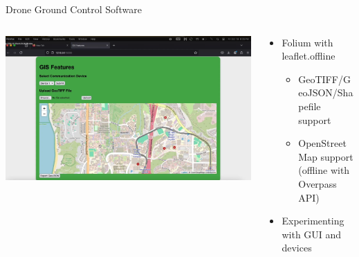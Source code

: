 \begin{frame}{Drone Ground Control Software}
    \begin{columns}
        \begin{column}{0.5\textwidth}
            \centering
            \includegraphics[height=0.7\textheight,width=\textwidth,keepaspectratio]{images/rtt/image.png}
        \end{column}
        \begin{column}{0.5\textwidth}
            \begin{itemize}
                \item Folium with leaflet.offline
                \begin{itemize}
                    \item GeoTIFF/GeoJSON/Shapefile support
                    \item OpenStreetMap support (offline with Overpass API)
                \end{itemize}
                \item Experimenting with GUI and devices
            \end{itemize}
        \end{column}
    \end{columns}
\end{frame}


